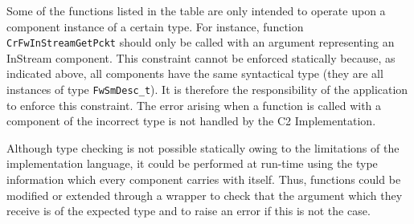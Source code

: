 \documentclass[a4paper,10pt]{article}
\begin{document}
Some of the functions listed in the table are only intended to operate upon a component instance of a certain type. For instance, function \texttt{CrFwInStreamGetPckt} should only be called with an argument representing an InStream component. This constraint cannot be enforced statically because, as indicated above, all components have the same syntactical type (they are all instances of type \texttt{FwSmDesc\_t}). It is therefore the responsibility of the application to enforce this constraint. The error arising when a function is called with a component of the incorrect type is not handled by the C2 Implementation. 

Although type checking is not possible statically owing to the limitations of the implementation language, it could be performed at run-time using the type information which every component carries with itself. Thus, functions could be modified or extended through a wrapper to check that the argument which they receive is of the expected type and to raise an error if this is not the case. 
\end{document}
